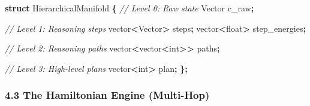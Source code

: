 \documentclass[
  11pt,
  a4paper,
]{article}
\newenvironment{Shaded}{\begin{snugshade}}{\end{snugshade}}
\newcommand{\CommentTok}[1]{\textcolor[rgb]{0.56,0.35,0.01}{\textit{#1}}}
\newcommand{\DataTypeTok}[1]{\textcolor[rgb]{0.13,0.29,0.53}{#1}}
\newcommand{\KeywordTok}[1]{\textcolor[rgb]{0.13,0.29,0.53}{\textbf{#1}}}
\newcommand{\NormalTok}[1]{#1}
\newcommand{\OperatorTok}[1]{\textcolor[rgb]{0.81,0.36,0.00}{\textbf{#1}}}
\begin{document}
\begin{Shaded}
\begin{Highlighting}[]
\KeywordTok{struct}\NormalTok{ HierarchicalManifold }\OperatorTok{\{}
    \CommentTok{// Level 0: Raw state}
\NormalTok{    Vector c\_raw}\OperatorTok{;}
    
    \CommentTok{// Level 1: Reasoning steps}
\NormalTok{    vector}\OperatorTok{\textless{}}\NormalTok{Vector}\OperatorTok{\textgreater{}}\NormalTok{ steps}\OperatorTok{;}
\NormalTok{    vector}\OperatorTok{\textless{}}\DataTypeTok{float}\OperatorTok{\textgreater{}}\NormalTok{ step\_energies}\OperatorTok{;}
    
    \CommentTok{// Level 2: Reasoning paths}
\NormalTok{    vector}\OperatorTok{\textless{}}\NormalTok{vector}\OperatorTok{\textless{}}\DataTypeTok{int}\OperatorTok{\textgreater{}\textgreater{}}\NormalTok{ paths}\OperatorTok{;}
    
    \CommentTok{// Level 3: High{-}level plans}
\NormalTok{    vector}\OperatorTok{\textless{}}\DataTypeTok{int}\OperatorTok{\textgreater{}}\NormalTok{ plan}\OperatorTok{;}
\OperatorTok{\};}
\end{Highlighting}
\end{Shaded}

\subsubsection{4.3 The Hamiltonian Engine
(Multi-Hop)}\label{the-hamiltonian-engine-multi-hop}
\end{document}

